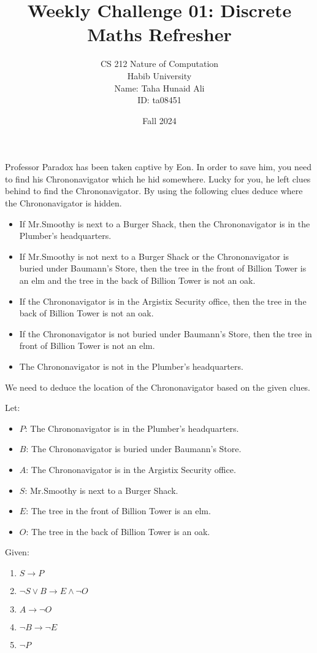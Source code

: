 \documentclass[a4paper]{exam}
\title{Weekly Challenge 01: Discrete Maths Refresher}
\author{CS 212 Nature of Computation\\Habib University\\Name: Taha Hunaid Ali\\ID: ta08451}
\date{Fall 2024}
\begin{document}
\maketitle

\begin{questions}
  
Professor Paradox has been taken captive by Eon. In order to save him, you need to find his Chrononavigator which he hid somewhere.
Lucky for you, he left clues behind to find the Chrononavigator. By using the following clues deduce where the Chrononavigator is hidden.
\begin{itemize}
    \item If Mr.Smoothy is next to a Burger Shack, then the Chrononavigator is in the Plumber's headquarters.
    \item If Mr.Smoothy is not next to a Burger Shack or the Chrononavigator is buried under Baumann's Store, then the tree in the front of Billion Tower is an elm and the tree in the back of Billion Tower is not an oak.
    \item If the Chrononavigator is in the Argistix Security office, then the tree in the back of Billion Tower is not an oak.
    \item If the Chrononavigator is not buried under Baumann's Store, then the tree in front of Billion Tower is not an elm.
    \item The Chrononavigator is not in the Plumber's headquarters.
\end{itemize}

\begin{solution}
We need to deduce the location of the Chrononavigator based on the given clues.

Let:
\begin{itemize}
    \item $P$: The Chrononavigator is in the Plumber's headquarters.
    \item $B$: The Chrononavigator is buried under Baumann's Store.
    \item $A$: The Chrononavigator is in the Argistix Security office.
    \item $S$: Mr.Smoothy is next to a Burger Shack.
    \item $E$: The tree in the front of Billion Tower is an elm.
    \item $O$: The tree in the back of Billion Tower is an oak.
\end{itemize}

Given:
\begin{enumerate}
    \item $S \rightarrow P$
    \item $\neg S \vee B \rightarrow E \wedge \neg O$
    \item $A \rightarrow \neg O$
    \item $\neg B \rightarrow \neg E$
    \item $\neg P$
\end{enumerate}


\end{solution}
\end{questions}
\end{document}
